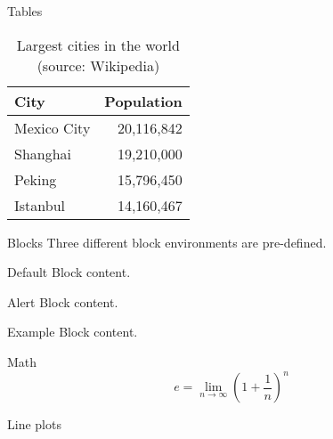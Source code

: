 \documentclass[10pt]{beamer}
\begin{document}
\begin{frame}{Tables}
  \begin{table}
    \caption{Largest cities in the world (source: Wikipedia)}
    \begin{tabular}{@{} lr @{}}
      \toprule
      City        & Population \\
      \midrule
      Mexico City & 20,116,842 \\
      Shanghai    & 19,210,000 \\
      Peking      & 15,796,450 \\
      Istanbul    & 14,160,467 \\
      \bottomrule
    \end{tabular}
  \end{table}
\end{frame}
\begin{frame}{Blocks}
  Three different block environments are pre-defined.

  \begin{block}{Default}
    Block content.
  \end{block}

  \begin{alertblock}{Alert}
    Block content.
  \end{alertblock}

  \begin{exampleblock}{Example}
    Block content.
  \end{exampleblock}

\end{frame}
\begin{frame}{Math}
  \begin{equation*}
    e = \lim_{n\to \infty} \left(1 + \frac{1}{n}\right)^n
  \end{equation*}
\end{frame}
\begin{frame}{Line plots}
  \begin{figure}
  \end{figure}
\end{frame}
\end{document}

